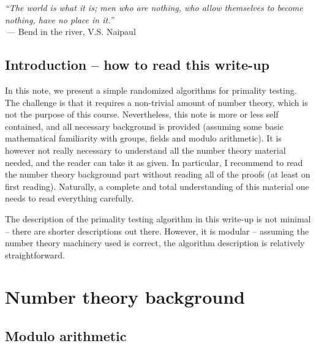 %

\ChapterPrefix{}
\ChapterGen{}


{
\begin{minipage}{0.9\linewidth}
    \textsl{``The world is what it is; men who are nothing, who allow
       themselves to become nothing, have no place in it.''
    }\\
    $~$\qquad\qquad--- Bend in the river, V.S. Naipaul
\end{minipage}}


\subsection*{Introduction -- how to read this write-up}


In this note, we present a simple randomized algorithms for primality
testing.  The challenge is that it requires a non-trivial amount of
number theory, which is not the purpose of this course. Nevertheless,
this note is more or less self contained, and all necessary background
is provided (assuming some basic mathematical familiarity with groups,
fields and modulo arithmetic). It is however not really necessary to
understand all the number theory material needed, and the reader can
take it as given. In particular, I recommend to read the number theory
background part without reading all of the proofs (at least on first
reading). Naturally, a complete and total understanding of this
material one needs to read everything carefully.

The description of the primality testing algorithm in this write-up is
not minimal -- there are shorter descriptions out there. However, it
is modular -- assuming the number theory machinery used is correct,
the algorithm description is relatively straightforward.



\section{Number theory background}


\subsection{Modulo arithmetic}

